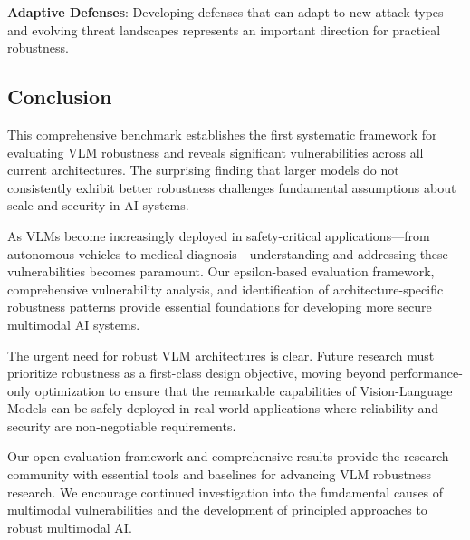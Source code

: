 \textbf{Adaptive Defenses}: Developing defenses that can adapt to new attack types and evolving threat landscapes represents an important direction for practical robustness.

\subsection{Conclusion}

This comprehensive benchmark establishes the first systematic framework for evaluating VLM robustness and reveals significant vulnerabilities across all current architectures. The surprising finding that larger models do not consistently exhibit better robustness challenges fundamental assumptions about scale and security in AI systems.

As VLMs become increasingly deployed in safety-critical applications---from autonomous vehicles to medical diagnosis---understanding and addressing these vulnerabilities becomes paramount. Our epsilon-based evaluation framework, comprehensive vulnerability analysis, and identification of architecture-specific robustness patterns provide essential foundations for developing more secure multimodal AI systems.

The urgent need for robust VLM architectures is clear. Future research must prioritize robustness as a first-class design objective, moving beyond performance-only optimization to ensure that the remarkable capabilities of Vision-Language Models can be safely deployed in real-world applications where reliability and security are non-negotiable requirements.

Our open evaluation framework and comprehensive results provide the research community with essential tools and baselines for advancing VLM robustness research. We encourage continued investigation into the fundamental causes of multimodal vulnerabilities and the development of principled approaches to robust multimodal AI.